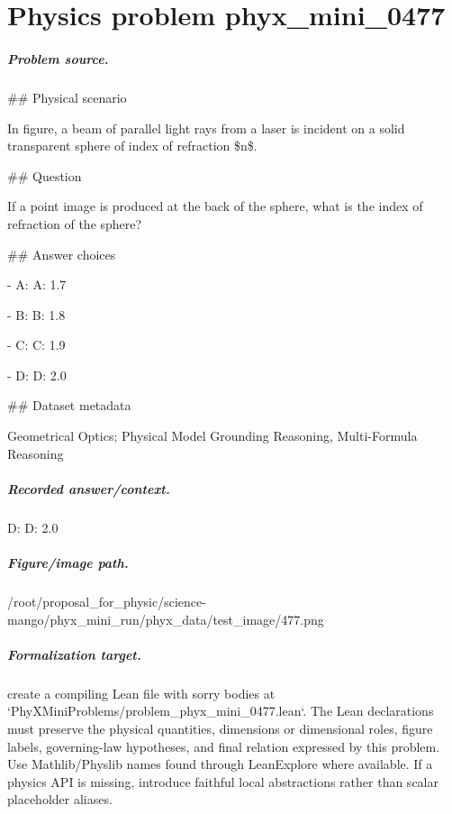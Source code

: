 
\chapter{Physics problem phyx\_mini\_0477}
\label{ch:PhyXMiniProblems_problem_phyx_mini_0477}

\paragraph{Problem source.}
\#\# Physical scenario

In figure, a beam of parallel light rays from a laser is incident on a solid transparent sphere of index of refraction \$n\$.

\#\# Question

If a point image is produced at the back of the sphere, what is the index of refraction of the sphere?

\#\# Answer choices

- A: A: 1.7

- B: B: 1.8

- C: C: 1.9

- D: D: 2.0

\#\# Dataset metadata

Geometrical Optics; Physical Model Grounding Reasoning, Multi-Formula Reasoning

\paragraph{Recorded answer/context.}
D: D: 2.0

\paragraph{Figure/image path.}
/root/proposal\_for\_physic/science-mango/phyx\_mini\_run/phyx\_data/test\_image/477.png

\paragraph{Formalization target.}
create a compiling Lean file with sorry bodies at `PhyXMiniProblems/problem\_phyx\_mini\_0477.lean`. The Lean declarations must preserve the physical quantities, dimensions or dimensional roles, figure labels, governing-law hypotheses, and final relation expressed by this problem.
Use Mathlib/Physlib names found through LeanExplore where available. If a physics API is missing, introduce faithful local abstractions rather than scalar placeholder aliases.

